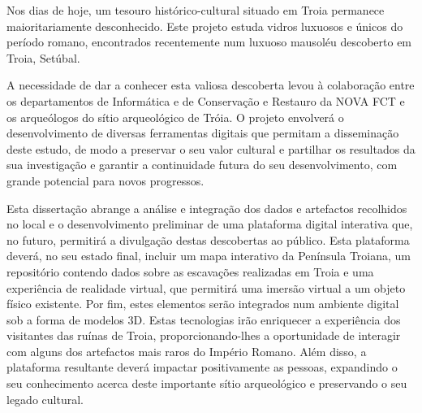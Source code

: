 
%

Nos dias de hoje, um tesouro histórico-cultural situado em Troia permanece maioritariamente desconhecido.  
Este projeto estuda vidros luxuosos e únicos do período romano, encontrados recentemente num luxuoso mausoléu descoberto em Troia, Setúbal.


A necessidade de dar a conhecer esta valiosa descoberta levou à colaboração entre os departamentos de Informática e de Conservação e Restauro da NOVA FCT e os arqueólogos do sítio arqueológico de Tróia. O projeto envolverá o desenvolvimento de diversas ferramentas digitais que permitam a disseminação deste estudo, de modo a preservar o seu valor cultural e partilhar os resultados da sua investigação
e garantir a continuidade futura do seu desenvolvimento, com grande potencial para novos progressos.

Esta dissertação abrange a análise e integração dos dados e artefactos recolhidos no local e o desenvolvimento preliminar de uma plataforma digital interativa que, no futuro, permitirá a divulgação destas descobertas ao público.
Esta plataforma deverá, no seu estado final, incluir um mapa interativo da Península Troiana, um repositório contendo dados sobre as escavações realizadas em Troia e uma experiência de realidade virtual, que permitirá uma imersão virtual a um objeto físico existente. 
Por fim, estes elementos serão integrados num ambiente digital sob a forma de modelos 3D.
Estas tecnologias irão enriquecer a experiência dos visitantes das ruínas de Troia, proporcionando-lhes a oportunidade de interagir com alguns dos artefactos mais raros do Império Romano. 
Além disso, a plataforma resultante deverá impactar positivamente as pessoas, expandindo o seu conhecimento acerca deste importante sítio arqueológico e preservando o seu legado cultural.



